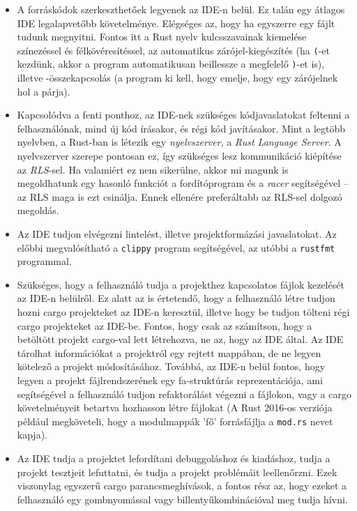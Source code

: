 \begin{itemize}
	\item A forráskódok szerkeszthetőek legyenek az IDE-n belül. Ez talán egy átlagos IDE legalapvetőbb követelménye. 
	Elégséges az, hogy ha egyszerre egy fájlt tudunk megnyitni. 
	Fontos itt a Rust nyelv kulcsszavainak kiemelése színezéssel és félkövéresítéssel, az automatikus zárójel-kiegészítés (ha \texttt{(}-et kezdünk, akkor a program automatikusan beillessze a megfelelő \texttt{)}-et is), 
	illetve -összekapcsolás (a program ki kell, hogy emelje, hogy egy zárójelnek hol a párja).
	
	\item Kapcsolódva a fenti ponthoz, az IDE-nek szükséges kódjavaslatokat feltenni a felhasználónak, mind új kód írásakor, és régi kód javításakor. 
	Mint a legtöbb nyelvben, a Rust-ban is létezik egy \emph{nyelvszerver}, a \emph{Rust Language Server}\cite{rls}. 
	A nyelvszerver szerepe pontosan ez, így szükséges lesz kommunikáció kiépítése az \emph{RLS}-sel. 
	Ha valamiért ez nem sikerülne, akkor mi magunk is megoldhatunk egy hasonló funkciót a fordítóprogram és a \emph{racer}\cite{racer} segítségével -- 
	az RLS maga is ezt csinálja. Ennek ellenére preferáltabb az RLS-sel dolgozó megoldás.\label{rls}
	
	\item Az IDE tudjon elvégezni lintelést, illetve projektformázási javaslatokat. 
	Az előbbi megvalósítható a \texttt{clippy}\cite{clippy} program segítségével, az utóbbi a \texttt{rustfmt}\cite{rustfmt} programmal.
	
	\item Szükséges, hogy a felhasználó tudja a projekthez kapcsolatos fájlok kezelését az IDE-n belülről. 
	Ez alatt az is értetendő, hogy a felhasználó létre tudjon hozni cargo projekteket az IDE-n keresztül, illetve hogy be tudjon tölteni régi cargo projekteket az IDE-be. 
	Fontos, hogy csak az számítson, hogy a betöltött projekt cargo-val lett létrehozva, ne az, hogy az IDE által. 
	Az IDE tárolhat információkat a projektról egy rejtett mappában, de ne legyen kötelező a projekt módosításához. 
	Továbbá, az IDE-n belül fontos, hogy legyen a projekt fájlrendszerének egy fa-struktúrás reprezentációja, ami segítségével a felhasználó tudjon refaktorálást végezni a fájlokon, vagy a cargo követelményeit betartva hozhasson létre fájlokat 
	(A Rust 2016-os verziója például megköveteli, hogy a modulmappák 'fő' forrásfájlja a \texttt{mod.rs} nevet kapja).
	
	\item Az IDE tudja a projektet lefordítani debuggoláshoz és kiadáshoz, tudja a projekt tesztjeit lefuttatni, és tudja a projekt problémáit leellenőrzni. 
	Ezek viszonylag egyszerű cargo parancsmeghívások, a fontos rész az, hogy ezeket a felhasználó egy gombnyomással vagy billentyűkombinációval meg tudja hívni.
	

\end{itemize}
